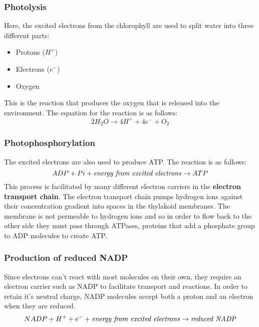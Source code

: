 \documentclass{article}
\begin{document}
\subsubsection*{Photolysis}
Here, the excited electrons from the chlorophyll are used to split water into
three different parts:
\begin{itemize}
	\item Protons ($H^{+}$)
	\item Electrons ($e^{-}$)
	\item Oxygen
\end{itemize}
This is the reaction that produces the oxygen that is released into the
environment. The equation for the reaction is as follows:
\[
	2H_2O \rightarrow 4H^+ + 4e^- + O_2
\]

\subsubsection*{Photophosphorylation}
The excited electrons are also used to produce ATP. The reaction is as follows:
\[
	ADP + Pi + \textrm{\textit{energy from excited electrons}} \rightarrow ATP
\]
This process is facilitated by many different electron carriers in the
\textbf{electron transport chain}. The electron transport chain pumps hydrogen
ions against their concentration gradient into spaces in the thylakoid
membranes. The membrane is not permeable to hydrogen ions and so in order to
flow back to the other side they must pass through ATPases, proteins that add a
phosphate group to ADP molecules to create ATP.

\begin{center}
\end{center}

\newpage
\subsubsection*{Production of reduced NADP}
Since electrons can't react with most molecules on their own, they require an
electron carrier such as NADP to facilitate transport and reactions. In order to
retain it's neutral charge, NADP molecules accept both a proton and an electron
when they are reduced.
\[
	NADP + H^+ + e^- +\textrm{\textit{energy from excited electrons}}\rightarrow
	\textrm{\textit{reduced NADP}}
\]
\end{document}
